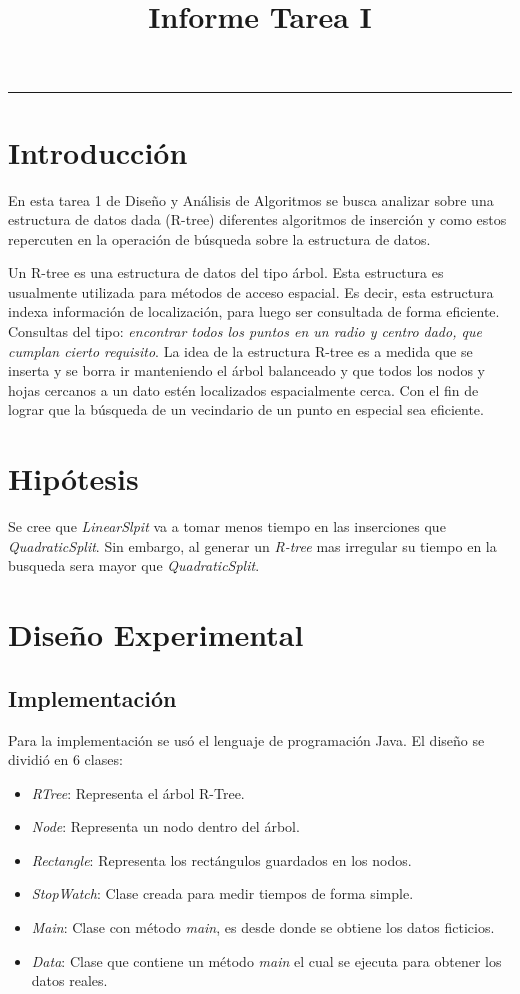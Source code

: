 \documentclass[letterpaper,12pt]{article}
\title{Informe Tarea I}
\makeatletter
\renewcommand{\maketitle}{\begin{titlepage}%
    \let\footnotesize\small
    \let\footnoterule\relax
    \parindent \z@
    \reset@font
    \null\vfil
    \begin{flushleft}    
      \small \@curso \par
      \huge{\textbf{\@title}} \par
    \end{flushleft}
    \par
    \hrule height 4pt
    \par
    \begin{flushright}
      \Huge{\textbf{\@author}} \par
      \bigskip
      \normalsize{\@primerautor} \par
      \normalsize{\@segundoautor} \par
      \bigskip
      \bigskip
      \normalsize \@date \par
    \end{flushright}
    \vskip 60\p@
    \vfil\null
  \end{titlepage}%
  \setcounter{footnote}{0}%
}
\makeatother
\begin{document}
 
\maketitle
 
 
\newpage
\thispagestyle{empty}
\tableofcontents
\setcounter{page}{0}
\newpage
 
\section{Introducci\'on}
En esta tarea 1 de Dise\~no y An\'alisis de Algoritmos se busca analizar sobre una estructura de datos dada (R-tree) diferentes algoritmos de inserci\'on y como estos repercuten en la operaci\'on de b\'usqueda sobre la estructura de datos.
	
Un R-tree es una estructura de datos del tipo \'arbol. Esta estructura es usualmente utilizada para m\'etodos de acceso espacial. Es decir, esta estructura indexa informaci\'on de localizaci\'on, para luego ser consultada de forma eficiente. Consultas del tipo: \textit{encontrar todos los puntos en un radio y centro dado, que cumplan cierto requisito}. La idea de la estructura R-tree es a medida que se inserta y se borra ir manteniendo el \'arbol balanceado y que todos los nodos y hojas cercanos a un dato est\'en localizados espacialmente cerca. Con el fin de lograr que la b\'usqueda de un vecindario de un punto en especial sea eficiente.

\newpage 
\section{Hip\'otesis}
Se cree que \textit{LinearSlpit} va a tomar menos tiempo en las inserciones que \textit{QuadraticSplit}. Sin embargo, al generar un \textit{R-tree} mas irregular su tiempo en la busqueda sera mayor que \textit{QuadraticSplit}. 

\newpage
\section{Dise\~no Experimental}
\subsection{Implementaci\'on}
Para la implementaci\'on se us\'o el lenguaje de programaci\'on Java. El dise\~no se dividi\'o en 6 clases:

\begin{itemize}
\item \textit{RTree}: Representa el \'arbol R-Tree.
\item \textit{Node}: Representa un nodo dentro del \'arbol.
\item \textit{Rectangle}: Representa los rect\'angulos guardados en los nodos.
\item \textit{StopWatch}: Clase creada para medir tiempos de forma simple.
\item \textit{Main}: Clase con m\'etodo \textit{main}, es desde donde se obtiene los datos ficticios.
\item \textit{Data}: Clase que contiene un método \textit{main} el cual se ejecuta para obtener los datos reales.
\end{itemize}
\end{document}
